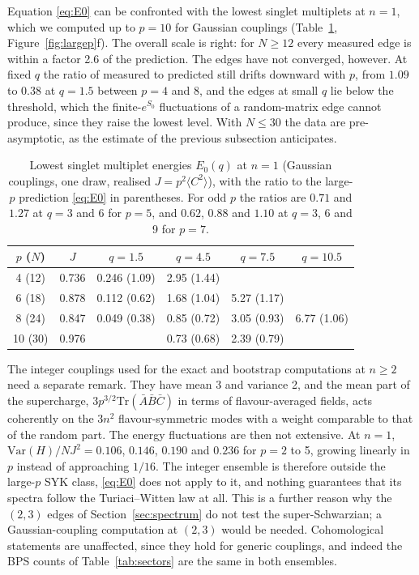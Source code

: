 \documentclass[10pt]{article}
\newcommand{\Tr}{\mathrm{Tr}}
\begin{document}
Equation \eqref{eq:E0} can be confronted with the lowest singlet multiplets at $n=1$, which we computed up to $p=10$
for Gaussian couplings (Table~\ref{tab:edges}, Figure~\ref{fig:largep}f). The overall scale is right: for $N\ge12$
every measured edge is within a factor 2.6 of the prediction. The edges have not converged, however. At fixed $q$ the
ratio of measured to predicted still drifts downward with $p$, from $1.09$ to $0.38$ at $q=1.5$ between $p=4$ and 8,
and the edges at small $q$ lie below the threshold, which the finite-$e^{S_0}$ fluctuations of a random-matrix edge
cannot produce, since they raise the lowest level. With $N\le30$ the data are pre-asymptotic, as the estimate of the
previous subsection anticipates.

\begin{table}[t]\centering\small
\begin{tabular}{cccccc}
\toprule
$p$ ($N$) & $J$ & $q=1.5$ & $q=4.5$ & $q=7.5$ & $q=10.5$\\
\midrule
4 (12) & 0.736 & 0.246 (1.09) & 2.95 (1.44) & & \\
6 (18) & 0.878 & 0.112 (0.62) & 1.68 (1.04) & 5.27 (1.17) & \\
8 (24) & 0.847 & 0.049 (0.38) & 0.85 (0.72) & 3.05 (0.93) & 6.77 (1.06)\\
10 (30) & 0.976 & & 0.73 (0.68) & 2.39 (0.79) & \\
\bottomrule
\end{tabular}
\caption{Lowest singlet multiplet energies $E_0(q)$ at $n=1$ (Gaussian couplings, one draw, realised
$J=p^2\langle C^2\rangle$), with the ratio to the large-$p$ prediction \eqref{eq:E0} in parentheses. For odd $p$ the
ratios are $0.71$ and $1.27$ at $q=3$ and 6 for $p=5$, and $0.62$, $0.88$ and $1.10$ at $q=3$, 6 and 9 for $p=7$.}
\label{tab:edges}
\end{table}

The integer couplings used for the exact and bootstrap computations at $n\ge2$ need a separate remark. They have mean
3 and variance 2, and the mean part of the supercharge, $3p^{3/2}\Tr(\bar A\bar B\bar C)$ in terms of
flavour-averaged fields, acts coherently on the $3n^2$ flavour-symmetric modes with a weight comparable to that of the
random part. The energy fluctuations are then not extensive. At $n=1$, $\mathrm{Var}(H)/NJ^2=0.106$, $0.146$, $0.190$
and $0.236$ for $p=2$ to 5, growing linearly in $p$ instead of approaching $1/16$. The integer ensemble is therefore
outside the large-$p$ SYK class, \eqref{eq:E0} does not apply to it, and nothing guarantees that its spectra follow the
Turiaci--Witten law at all. This is a further reason why the $(2,3)$ edges of Section~\ref{sec:spectrum} do not test
the super-Schwarzian; a Gaussian-coupling computation at $(2,3)$ would be needed. Cohomological statements are
unaffected, since they hold for generic couplings, and indeed the BPS counts of Table~\ref{tab:sectors} are the same
in both ensembles.
\end{document}
